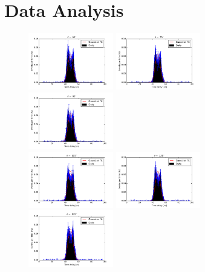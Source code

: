 \documentclass[a4paper,parskip,11pt, DIV12]{scrreprt}
\begin{document}
\section{Data Analysis}\label{app:histogram}
%
\begin{figure}[H]
\centering
\includegraphics[width=0.33\textwidth]{60deg.png}\hfill
\includegraphics[width=0.33\textwidth]{75deg.png}\hfill
\includegraphics[width=0.33\textwidth]{90deg.png}\\
\includegraphics[width=0.33\textwidth]{105deg.png}\hfill
\includegraphics[width=0.33\textwidth]{120deg.png}\hfill
\includegraphics[width=0.33\textwidth]{135deg.png}\\

\end{figure}
\end{document}
